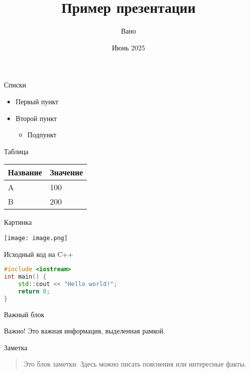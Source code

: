 \documentclass{beamer}
\title{Пример презентации}
\author{Вано}
\institute{Университет Технологий}
\date{Июнь 2025}
\begin{document}
\begin{frame}
  \titlepage
\end{frame}

\begin{frame}{Списки}
\begin{itemize}
  \item Первый пункт
  \item Второй пункт
  \begin{itemize}
    \item Подпункт
  \end{itemize}
\end{itemize}
\end{frame}

\begin{frame}{Таблица}
\begin{tabular}{@{}ll@{}}
\toprule
Название & Значение \\
\midrule
A        & 100      \\
B        & 200      \\
\bottomrule
\end{tabular}
\end{frame}

\begin{frame}{Картинка}
\begin{center}
  \texttt{[image: image.png]}
\end{center}
\end{frame}

\begin{frame}[fragile]{Исходный код на C++}
\begin{lstlisting}[language=C++]
#include <iostream>
int main() {
    std::cout << "Hello world!";
    return 0;
}
\end{lstlisting}
\end{frame}

\begin{frame}{Важный блок}
\begin{block}{Важно!}
Это важная информация, выделенная рамкой.
\end{block}
\end{frame}

\begin{frame}{Заметка}
\begin{quote}
Это блок заметки. Здесь можно писать пояснения или интересные факты.
\end{quote}
\end{frame}
\end{document}
